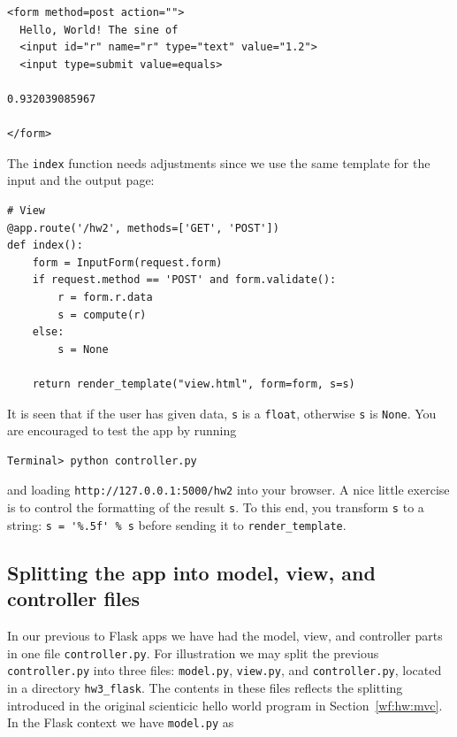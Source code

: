 \documentclass[%
oneside,                 %
final,                   %
10pt]{article}
\begin{document}
\begin{Verbatim}[numbers=none,fontsize=\fontsize{9pt}{9pt},baselinestretch=0.85]
<form method=post action="">
  Hello, World! The sine of
  <input id="r" name="r" type="text" value="1.2">
  <input type=submit value=equals>

0.932039085967

</form>
\end{Verbatim}

The \Verb!index! function needs adjustments since we use the same
template for the input and the output page:

\begin{Verbatim}[numbers=none,fontsize=\fontsize{9pt}{9pt},baselinestretch=0.85]
# View
@app.route('/hw2', methods=['GET', 'POST'])
def index():
    form = InputForm(request.form)
    if request.method == 'POST' and form.validate():
        r = form.r.data
        s = compute(r)
    else:
        s = None

    return render_template("view.html", form=form, s=s)
\end{Verbatim}
It is seen that if the user has given data, \Verb!s! is a \Verb!float!, otherwise
\Verb!s! is \Verb!None!. You are encouraged to test the app by running

\begin{Verbatim}[numbers=none,fontsize=\fontsize{9pt}{9pt},baselinestretch=0.85]
Terminal> python controller.py
\end{Verbatim}
and loading \Verb!http://127.0.0.1:5000/hw2! into your browser.
A nice little exercise is to control the formatting of the result \Verb!s!.
To this end, you transform \Verb!s! to a string: \Verb!s = '%.5f' % s! before
sending it to \Verb!render_template!.

\subsection{Splitting the app into model, view, and controller files}
\label{wf:hw3:flask}




In our previous to Flask apps we have had the model, view, and
controller parts in one file \Verb!controller.py!. For illustration we
may split the previous \Verb!controller.py! into three files:
\Verb!model.py!, \Verb!view.py!, and \Verb!controller.py!, located in a
directory \Verb!hw3_flask!. The contents
in these files reflects the splitting introduced in the original
scienticic hello world program in Section~\ref{wf:hw:mvc}.
In the Flask context we have \Verb!model.py! as
\end{document}
